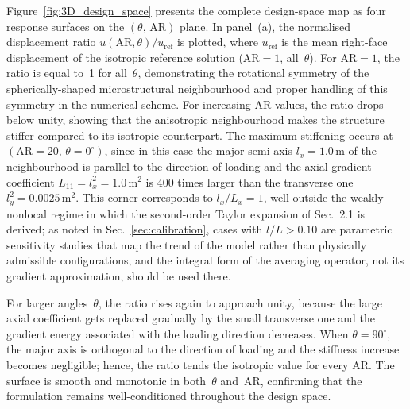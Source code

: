 \documentclass[final,3p,times,fleqn]{elsarticle}
\begin{document}
Figure~\ref{fig:3D_design_space} presents the complete design-space
map as four response surfaces on the
$(\theta,\,\mathrm{AR})$ plane.
In panel~(a), the normalised displacement ratio
$u(\mathrm{AR},\theta)/u_{\mathrm{ref}}$ is plotted, where $u_{\mathrm{ref}}$
is the mean right-face displacement of the isotropic reference solution
($\mathrm{AR}=1$, all~$\theta$). For $\mathrm{AR}=1$, the ratio is equal to~1
for all~$\theta$, demonstrating the rotational symmetry of the spherically-shaped
microstructural neighbourhood and proper handling of this symmetry in the
numerical scheme.
For increasing AR values, the ratio drops below unity, showing
that the anisotropic neighbourhood makes the structure stiffer compared to
its isotropic counterpart.
The maximum stiffening occurs at
$(\mathrm{AR}=20,\,\theta=0^{\circ})$, since in this case the major semi-axis 
$l_{x} = 1.0$\,m of the neighbourhood is parallel to the direction of loading
and the axial gradient coefficient $L_{11}
=l_{x}^{2} = 1.0$\,m$^{2}$ is 400 times larger than the transverse one 
$l_{y}^{2} = 0.0025$\,m$^{2}$.
This corner corresponds to $l_{x}/L_{x}=1$, well outside the
weakly nonlocal regime in which the second-order Taylor expansion of
Sec.~2.1 is derived; as noted in
Sec.~\ref{sec:calibration}, cases with $l/L>0.10$ are parametric
sensitivity studies that map the trend of the model rather than
physically admissible configurations, and the integral form of the
averaging operator, not its gradient approximation, should be used
there.

For larger angles~$\theta$, the ratio rises again to approach unity, because the
large axial coefficient gets replaced gradually by the small transverse one
and the gradient energy associated with the loading direction decreases.
When $\theta = 90^{\circ}$, the major axis is orthogonal to the direction of
loading and the stiffness increase becomes negligible; hence, the ratio tends the isotropic value for every AR.
The surface is smooth and monotonic in both~$\theta$ and~AR,
confirming that the formulation remains well-conditioned throughout
the design space.
\end{document}
